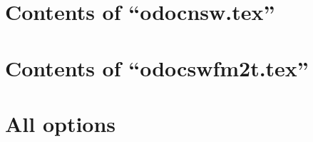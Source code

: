 \section{Contents of ``odocnsw.tex''}

\begin{itemize}

\end{itemize}

\section{Contents of ``odocswfm2t.tex''}

\begin{itemize}

\end{itemize}

\section{All options}

\begin{itemize}

\end{itemize}

